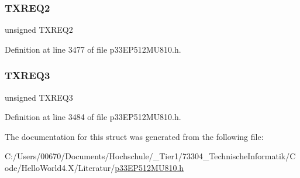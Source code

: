 \mbox{\label{structtag_c1_t_r23_c_o_n_b_i_t_s_ab6c9ac0d87cabb9c2ec33ae25d6597a7}} 
\subsubsection{\texorpdfstring{T\+X\+R\+E\+Q2}{TXREQ2}}
{\footnotesize\ttfamily unsigned T\+X\+R\+E\+Q2}



Definition at line 3477 of file p33\+E\+P512\+M\+U810.\+h.

\mbox{\label{structtag_c1_t_r23_c_o_n_b_i_t_s_a47e1fc4fb58ee84e505cba762a6d1acf}} 
\subsubsection{\texorpdfstring{T\+X\+R\+E\+Q3}{TXREQ3}}
{\footnotesize\ttfamily unsigned T\+X\+R\+E\+Q3}



Definition at line 3484 of file p33\+E\+P512\+M\+U810.\+h.



The documentation for this struct was generated from the following file\+:\begin{DoxyCompactItemize}
\item 
C\+:/\+Users/00670/\+Documents/\+Hochschule/\+\_\+\+Tier1/73304\+\_\+\+Technische\+Informatik/\+Code/\+Hello\+World4.\+X/\+Literatur/\hyperlink{p33_e_p512_m_u810_8h}{p33\+E\+P512\+M\+U810.\+h}\end{DoxyCompactItemize}
